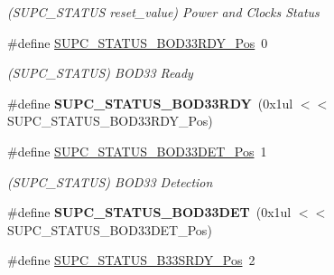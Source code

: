 \begin{DoxyCompactItemize}
\begin{DoxyCompactList}\small\item\em (S\+U\+P\+C\+\_\+\+S\+T\+A\+T\+U\+S reset\+\_\+value) Power and Clocks Status \end{DoxyCompactList}\item 
\hypertarget{group___s_a_m_l21___s_u_p_c_gaf28b8cca5834986d6ad4d40e0dbc65ea}{}\#define \hyperlink{group___s_a_m_l21___s_u_p_c_gaf28b8cca5834986d6ad4d40e0dbc65ea}{S\+U\+P\+C\+\_\+\+S\+T\+A\+T\+U\+S\+\_\+\+B\+O\+D33\+R\+D\+Y\+\_\+\+Pos}~0\label{group___s_a_m_l21___s_u_p_c_gaf28b8cca5834986d6ad4d40e0dbc65ea}

\begin{DoxyCompactList}\small\item\em (S\+U\+P\+C\+\_\+\+S\+T\+A\+T\+U\+S) B\+O\+D33 Ready \end{DoxyCompactList}\item 
\hypertarget{group___s_a_m_l21___s_u_p_c_gaac8eebe54b0d54fc3f749aedb8c20523}{}\#define {\bfseries S\+U\+P\+C\+\_\+\+S\+T\+A\+T\+U\+S\+\_\+\+B\+O\+D33\+R\+D\+Y}~(0x1ul $<$$<$ S\+U\+P\+C\+\_\+\+S\+T\+A\+T\+U\+S\+\_\+\+B\+O\+D33\+R\+D\+Y\+\_\+\+Pos)\label{group___s_a_m_l21___s_u_p_c_gaac8eebe54b0d54fc3f749aedb8c20523}

\item 
\hypertarget{group___s_a_m_l21___s_u_p_c_ga714440cf06994c73315b516b72c45fd3}{}\#define \hyperlink{group___s_a_m_l21___s_u_p_c_ga714440cf06994c73315b516b72c45fd3}{S\+U\+P\+C\+\_\+\+S\+T\+A\+T\+U\+S\+\_\+\+B\+O\+D33\+D\+E\+T\+\_\+\+Pos}~1\label{group___s_a_m_l21___s_u_p_c_ga714440cf06994c73315b516b72c45fd3}

\begin{DoxyCompactList}\small\item\em (S\+U\+P\+C\+\_\+\+S\+T\+A\+T\+U\+S) B\+O\+D33 Detection \end{DoxyCompactList}\item 
\hypertarget{group___s_a_m_l21___s_u_p_c_ga567f8f04ec2fbd46c024e22798d7d0f2}{}\#define {\bfseries S\+U\+P\+C\+\_\+\+S\+T\+A\+T\+U\+S\+\_\+\+B\+O\+D33\+D\+E\+T}~(0x1ul $<$$<$ S\+U\+P\+C\+\_\+\+S\+T\+A\+T\+U\+S\+\_\+\+B\+O\+D33\+D\+E\+T\+\_\+\+Pos)\label{group___s_a_m_l21___s_u_p_c_ga567f8f04ec2fbd46c024e22798d7d0f2}

\item 
\hypertarget{group___s_a_m_l21___s_u_p_c_ga02dfae77377b222f7184a37406bd3ed9}{}\#define \hyperlink{group___s_a_m_l21___s_u_p_c_ga02dfae77377b222f7184a37406bd3ed9}{S\+U\+P\+C\+\_\+\+S\+T\+A\+T\+U\+S\+\_\+\+B33\+S\+R\+D\+Y\+\_\+\+Pos}~2\label{group___s_a_m_l21___s_u_p_c_ga02dfae77377b222f7184a37406bd3ed9}


\end{DoxyCompactItemize}
